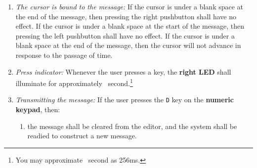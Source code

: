 \begin{enumerate}
\begin{enumerate}
        \end{enumerate}
    \item \textit{The cursor is bound to the message:} \label{spec:boundCursor} If the cursor is under a blank space at the end of the message, then pressing the right pushbutton shall have no effect.
        If the cursor is under a blank space at the start of the message, then pressing the left pushbutton shall have no effect.
        If the cursor is under a blank space at the end of the message, then the cursor will not advance in response to the passage of time.
    \item \textit{Press indicator:} \label{spec:pressIndicator} Whenever the user presses a key, the \textbf{right LED} shall illuminate for approximately \textonequarter\ second.\footnote{
            You may approximate \textonequarter\ second as 256ms.
        }
    \item \textit{Transmitting the message:} \label{spec:transmission} If the user presses the \texttt{D} key on the \textbf{numeric keypad}, then:
        \begin{enumerate}
            \item the message shall be cleared from the editor, and the system shall be readied to construct a new message.
        \end{enumerate}
\end{enumerate}